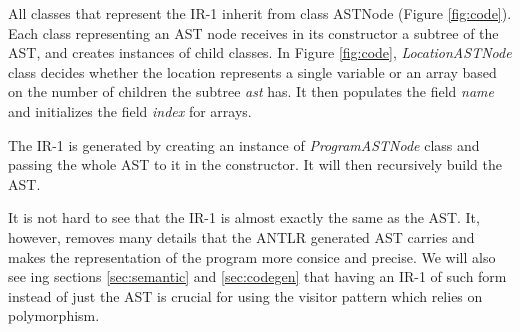 \documentclass{article}[11pt]
\begin{document}
All classes that represent the IR-1 inherit from class ASTNode (Figure \ref{fig:code}). Each class representing an AST node receives in its constructor a subtree of the AST, and creates instances of child classes. In Figure \ref{fig:code}, \textit{LocationASTNode} class decides whether the location represents a single variable or an array based on the number of children the subtree \textit{ast} has. It then populates the field \textit{name} and initializes the field \textit{index} for arrays.

The IR-1 is generated by creating an instance of \textit{ProgramASTNode} class and passing the whole AST to it in the constructor. It will then recursively build the AST.

It is not hard to see that the IR-1 is almost exactly the same as the AST. It, however, removes many details that the ANTLR generated AST carries and makes the representation of the program more consice and precise. We will also see ing sections \ref{sec:semantic} and \ref{sec:codegen} that having an IR-1 of such form instead of just the AST is crucial for using the visitor pattern which relies on polymorphism.
\end{document}
